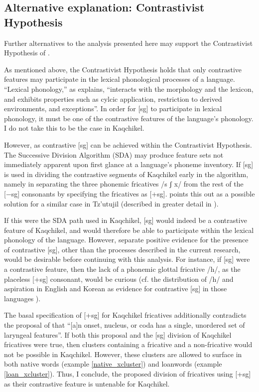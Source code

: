 \documentclass[output=paper,colorlinks,citecolor=brown]{langscibook}
\begin{document}
\subsection{Alternative explanation: Contrastivist Hypothesis}\label{Alternative explanation: Contrastivist Hypothesis}
Further alternatives to the analysis presented here may support the Contrastivist Hypothesis of \citet{Dresher:2009}.

As mentioned above, the Contrastivist Hypothesis holds that only contrastive features may participate in the lexical phonological processes of a language. “Lexical phonology,” as \citet[118]{Dresher:2009} explains, “interacts with the morphology and the lexicon, and exhibits properties such as cylcic application, restriction to derived environments, and exceptions”. In order for [sg] to participate in lexical phonology, it must be one of the contrastive features of the language's phonology. I do not take this to be the case in Kaqchikel. 

However, as  contrastive [sg] can be achieved within the Contrastivist Hypothesis. The Successive Division Algorithm (SDA) may produce feature sets not immediately apparent upon first glance at a language's phoneme inventory. If [sg] is used in dividing the contrastive segments of Kaqchikel early in the algorithm, namely in separating the three phonemic fricatives /s ʃ x/ from the rest of the [−sg] consonants by specifying the fricatives as [+sg]. \citet{wax_cavallaro_2020} points this out as a possible solution for a similar case in Tz’utujil (described in greater detail in ).

If this were the SDA path used in Kaqchikel, [sg] would indeed be a contrastive feature of Kaqchikel, and would therefore be able to participate within the lexical phonology of the language. However, separate positive evidence for the presence of contrastive [sg], other than the processes described in the current research, would be desirable before continuing with this analysis. For instance, if [sg] were a contrastive feature, then the lack of a phonemic glottal fricative /h/, as the placeless [+sg] consonant, would be curious (cf. the distribution of /h/ and aspiration in English and Korean as evidence for contrastive [sg] in those languages \citep{davis_cho_2003}). 

The basal specification of [+sg] for Kaqchikel fricatives additionally contradicts the proposal of \citet[2]{kehrein_golston_2004} that “[a]n onset, nucleus, or coda has a single, unordered set of laryngeal features”. If both this proposal and the [sg] division of Kaqchikel fricatives were true, then clusters containing a fricative and a non-fricative would not be possible in Kaqchikel. However, these clusters are allowed to surface in both native words (example \ref{native_xcluster}) and loanwords (example \ref{loan_xcluster}). Thus, I conclude, the proposed division of fricatives using [+sg] as their contrastive feature is untenable for Kaqchikel.
\end{document}

